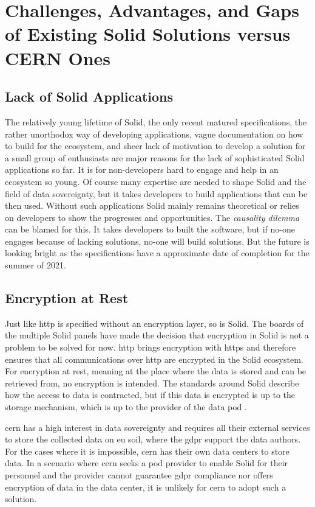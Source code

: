 \section{Challenges, Advantages, and Gaps of Existing Solid Solutions versus CERN Ones}

\subsection{Lack of Solid Applications}\label{challenges:lack}

The relatively young lifetime of Solid, the only recent matured specifications, the rather unorthodox way of developing applications, vague documentation on how to build for the ecosystem, and sheer lack of motivation to develop a solution for a small group of enthusiasts are major reasons for the lack of sophisticated Solid applications so far. It is for non-developers hard to engage and help in an ecosystem so young. Of course many expertise are needed to shape Solid and the field of data sovereignty, but it takes developers to build applications that can be then used. Without such applications Solid mainly remains theoretical or relies on developers to show the progresses and opportunities. The \textit{causality dilemma} can be blamed for this. It takes developers to built the software, but if no-one engages because of lacking solutions, no-one will build solutions. But the future is looking bright as the specifications have a approximate date of completion for the summer of 2021.

\subsection{Encryption at Rest}

Just like \gls{http} is specified without an encryption layer, so is Solid. The boards of the multiple Solid panels \cite{solid-panels} have made the decision that encryption in Solid is not a problem to be solved for now. \gls{http} brings encryption with \gls{https} and therefore ensures that all communications over \gls{http} are encrypted in the Solid ecosystem. For encryption at rest, meaning at the place where the data is stored and can be retrieved from, no encryption is intended. The standards around Solid describe how the access to data is contracted, but if this data is encrypted is up to the storage mechanism, which is up to the provider of the data pod \cite{solidproject-faqs}.

\gls{cern} has a high interest in data sovereignty and requires all their external services to store the collected data on \gls{eu} soil, where the \gls{gdpr} support the data authors. For the cases where it is impossible, \gls{cern} has their own data centers to store data. In a scenario where \gls{cern} seeks a pod provider to enable Solid for their personnel and the provider cannot guarantee \gls{gdpr} compliance nor offers encryption of data in the data center, it is unlikely for \gls{cern} to adopt such a solution.

